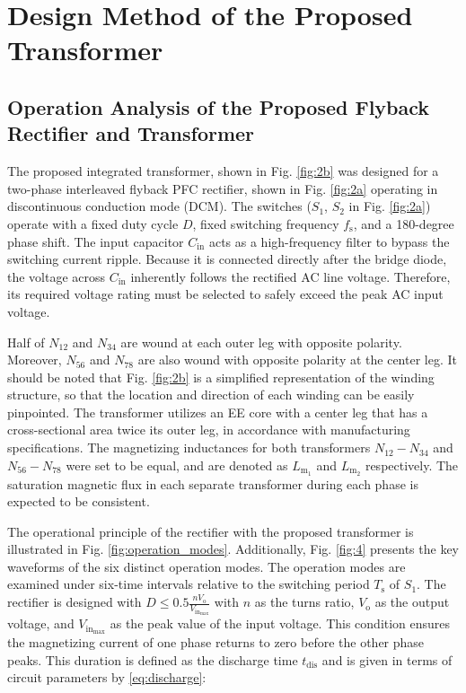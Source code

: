 \documentclass[lettersize,journal]{IEEEtran}
\begin{document}
\section{Design Method of the Proposed Transformer}
\subsection{Operation Analysis of the Proposed Flyback Rectifier and Transformer}
The proposed integrated transformer, shown in Fig. \ref{fig:2b} was designed for a two-phase interleaved flyback PFC rectifier, shown in Fig. \ref{fig:2a} operating in discontinuous conduction mode (DCM). The switches ($S_1$, $S_2$ in Fig. \ref{fig:2a}) operate with a fixed duty cycle $D$, fixed switching frequency $f_\mathrm{s}$, and a 180-degree phase shift. The input capacitor $C_\mathrm{in}$ acts as a high-frequency filter to bypass the switching current ripple. Because it is connected directly after the bridge diode, the voltage across $C_\mathrm{in}$ inherently follows the rectified AC line voltage. Therefore, its required voltage rating must be selected to safely exceed the peak AC input voltage.

Half of $N_{12}$ and $N_{34}$ are wound at each outer leg with opposite polarity. Moreover, $N_{56}$ and $N_{78}$ are also wound with opposite polarity at the center leg. It should be noted that Fig. \ref{fig:2b} is a simplified representation of the winding structure, so that the location and direction of each winding can be easily pinpointed. The transformer utilizes an EE core with a center leg that has a cross-sectional area twice its outer leg, in accordance with manufacturing specifications. The magnetizing inductances for both transformers $N_{12}-N_{34}$ and $N_{56}-N_{78}$ were set to be equal, and are denoted as $L_{\mathrm{m}_1}$ and $L_{\mathrm{m}_2}$ respectively. The saturation magnetic flux in each separate transformer during each phase is expected to be consistent.

The operational principle of the rectifier with the proposed transformer is illustrated in Fig. \ref{fig:operation_modes}. Additionally, Fig. \ref{fig:4} presents the key waveforms of the six distinct operation modes. The operation modes are examined under six-time intervals relative to the switching period $T_\mathrm{s}$ of $S_1$. The rectifier is designed with $D \le 0.5 \frac{n V_{\mathrm{o}}}{V_{\mathrm{in}_{\mathrm{max}}}}$ with $n$ as the turns ratio, $V_{\mathrm{o}}$ as the output voltage, and $V_{\mathrm{in}_{\mathrm{max}}}$ as the peak value of the input voltage. This condition ensures the magnetizing current of one phase returns to zero before the other phase peaks. This duration is defined as the discharge time $t_{\mathrm{dis}}$ and is given in terms of circuit parameters by \eqref{eq:discharge}:
\end{document}

